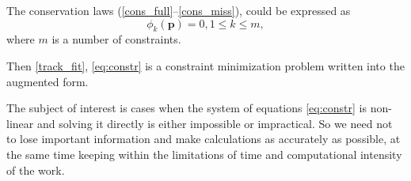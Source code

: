 %


The conservation laws (\ref{cons_full}--\ref{cons_miss}), could be expressed as
\begin{equation}
\label{eq:constr}
\phi_k(\boldsymbol{p}) = 0, 1 \leqslant k  \leqslant m,
\end{equation}
where $m$ is a number of constraints.

Then \eqref{track_fit}, \eqref{eq:constr} is a constraint minimization problem written into the augmented form.

The subject of interest is cases when the system of equations \eqref{eq:constr} is non-linear and solving it directly is either impossible or impractical. %
So we need not to lose important information and make calculations as accurately as possible, at the same time keeping within the limitations of time and computational intensity of the work.
